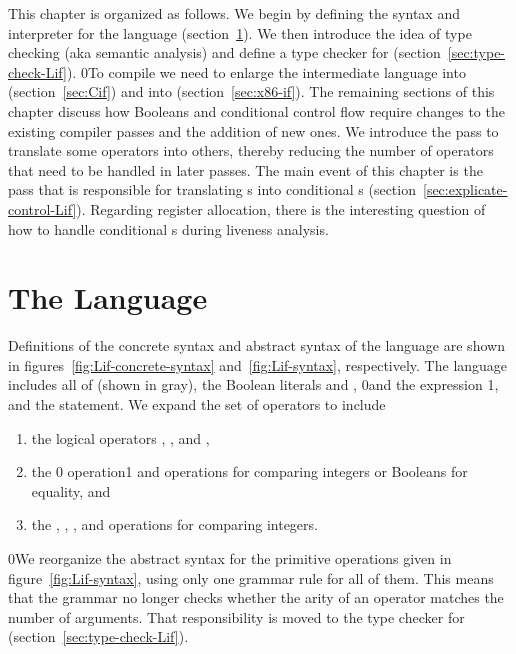 \documentclass[7x10]{TimesAPriori_MIT}%
\def\racketEd{0}
\def\pythonEd{1}
\def\edition{1}
\newcommand{\racket}[1]{{\if\edition\racketEd{#1}\fi}}
\newcommand{\pythonColor}[0]{}
\newcommand{\python}[1]{{\if\edition\pythonEd\pythonColor #1\fi}}
\numberwithin{theorem}{chapter}
\numberwithin{definition}{chapter}
\numberwithin{equation}{chapter}
\begin{document}
This chapter is organized as follows.  We begin by defining the syntax
and interpreter for the \LangIf{} language
(section~\ref{sec:lang-if}). We then introduce the idea of type
checking (aka semantic analysis)
and define a type checker for \LangIf{}
(section~\ref{sec:type-check-Lif}).
%
\racket{To compile \LangIf{} we need to enlarge the intermediate
  language \LangCVar{} into \LangCIf{} (section~\ref{sec:Cif}) and
  \LangXInt{} into \LangXIf{} (section~\ref{sec:x86-if}).}
%
The remaining sections of this chapter discuss how Booleans and
conditional control flow require changes to the existing compiler
passes and the addition of new ones. We introduce the 
pass to translate some operators into others, thereby reducing the
number of operators that need to be handled in later passes.
%
The main event of this chapter is the  pass
that is responsible for translating s into conditional
s (section~\ref{sec:explicate-control-Lif}).
%
Regarding register allocation, there is the interesting question of
how to handle conditional s during liveness analysis.


\section{The \LangIf{} Language}
\label{sec:lang-if}

Definitions of the concrete syntax and abstract syntax of the
\LangIf{} language are shown in figures~\ref{fig:Lif-concrete-syntax}
and~\ref{fig:Lif-syntax}, respectively. The \LangIf{} language
includes all of \LangVar{} {(shown in gray)}, the Boolean
literals
\TRUE{} and \FALSE{}, \racket{and} the  expression%
\python{, and the \code{if} statement}. We expand the set of
operators to include
\begin{enumerate}
\item the logical operators , , and ,
\item the \racket{ operation}\python{\key{==} and \key{!=} operations}
  for comparing integers or Booleans for equality, and
\item the \key{<}, \key{<=},
  \key{>}, and
  \key{>=} operations for
  comparing integers.
\end{enumerate}

\racket{We reorganize the abstract syntax for the primitive
  operations given in figure~\ref{fig:Lif-syntax}, using only one grammar
  rule for all of them. This means that the grammar no longer checks
  whether the arity of an operator matches the number of
  arguments. That responsibility is moved to the type checker for
  \LangIf{} (section~\ref{sec:type-check-Lif}).}
\end{document}
